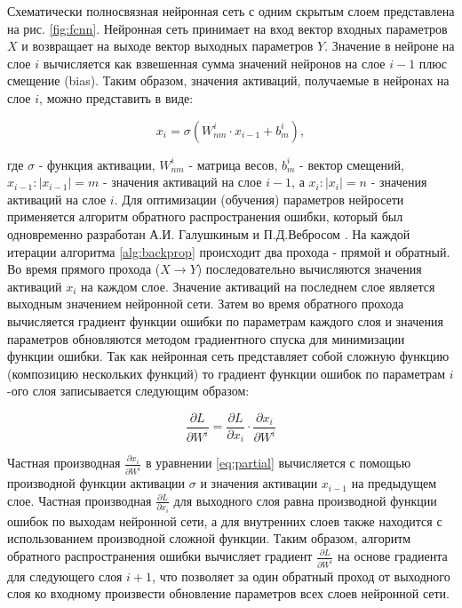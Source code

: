 Схематически полносвязная нейронная сеть с одним скрытым слоем представлена на рис. \ref{fig:fcnn}. Нейронная сеть принимает на вход вектор входных параметров $X$ и возвращает на выходе вектор выходных параметров $Y$. Значение в нейроне на слое $i$ вычисляется как взвешенная сумма значений нейронов на слое $i - 1$ плюс смещение (bias). Таким образом, значения активаций, получаемые в нейронах на слое $i$, можно представить в виде: 

\begin{equation}
    x_i = \sigma(W^i_{nm} \cdot x_{i - 1} + b^i_m),
\label{eq:lin_layer}
\end{equation}

где $\sigma$ - функция активации, $W^i_{nm}$ - матрица весов, $b^i_m$ - вектор смещений, $x_{i - 1}: |x_{i - 1}| = m$ - значения активаций на слое $i - 1$, а $x_{i}: |x_{i}| = n$ - значения активаций на слое $i$. Для оптимизации (обучения) параметров нейросети применяется алгоритм обратного распространения ошибки, который был одновременно разработан А.И. Галушкиным \cite{Galushkin} и П.Д.Вебросом \cite{webros_1974}. На каждой итерации алгоритма \ref{alg:backprop} происходит два прохода - прямой и обратный. Во время прямого прохода ($X \to Y$) последовательно вычисляются значения активаций $x_i$ на каждом слое. Значение активаций на последнем слое является выходным значением нейронной сети. Затем во время обратного прохода вычисляется градиент функции ошибки по параметрам каждого слоя и значения параметров обновляются методом градиентного спуска для минимизации функции ошибки. Так как нейронная сеть представляет собой сложную функцию (композицию нескольких функций) то градиент функции ошибок по параметрам $i$-ого слоя записывается следующим образом: 

\begin{equation}
    \frac{\partial L}{\partial W^i} = \frac{\partial L}{\partial x_i} \cdot  \frac{\partial x_i}{\partial W^i}
\label{eq:partial}
\end{equation}

Частная производная $\frac{\partial x_i}{\partial W^i}$ в уравнении \ref{eq:partial} вычисляется с помощью производной функции активации $\sigma$ и значения активации $x_{i-1}$ на предыдущем слое. Частная производная $\frac{\partial L}{\partial x_i}$ для выходного слоя равна производной функции ошибок по выходам нейронной сети, а для внутренних слоев также находится с использованием производной сложной функции. Таким образом, алгоритм обратного распространения ошибки вычисляет градиент $\frac{\partial L}{\partial W^i}$ на основе градиента для следующего слоя $i + 1$, что позволяет за один обратный проход от выходного слоя ко входному произвести обновление параметров всех слоев нейронной сети.

